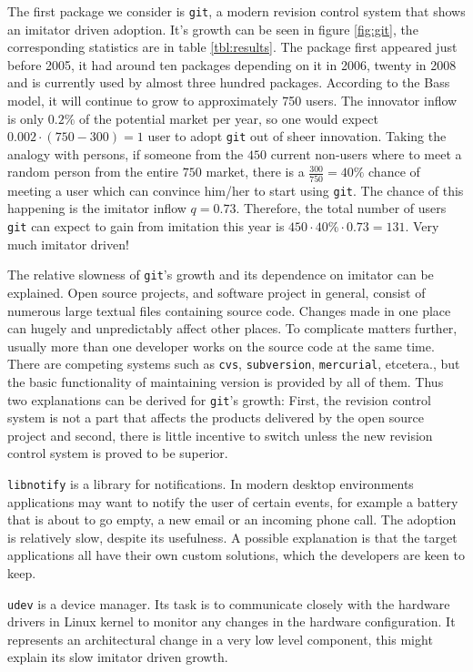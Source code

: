 \documentclass[smallextended,final]{svjour3}
\begin{document}
The first package we consider is \verb|git|, a modern revision control system that shows an imitator driven adoption. It's growth can be seen in figure \ref{fig:git}, the corresponding statistics are in table \ref{tbl:results}. The package first appeared just before 2005, it had around ten packages depending on it in 2006, twenty in 2008 and is currently used by almost three hundred packages. According to the Bass model, it will continue to grow to approximately 750 users. The innovator inflow is only $0.2\%$ of the potential market per year, so one would expect $0.002\cdot (750 - 300) = 1$ user to adopt \verb|git| out of sheer innovation. Taking the analogy with persons, if someone from the $450$ current non-users where to meet a random person from the entire $750$ market, there is a $\frac{300}{750}= 40\%$ chance of meeting a user which can convince him/her to start using \verb|git|. The chance of this happening is the imitator inflow $q = 0.73$. Therefore, the total number of users \verb|git| can expect to gain from imitation this year is $450\cdot 40\%\cdot 0.73 = 131$. Very much imitator driven!

The relative slowness of \verb|git|'s growth and its dependence on imitator can be explained. Open source projects, and software project in general, consist of numerous large textual files containing source code. Changes made in one place can hugely and unpredictably affect other places. To complicate matters further, usually more than one developer works on the source code at the same time. There are competing systems such as \verb|cvs|, \verb|subversion|, \verb|mercurial|, etcetera., but the basic functionality of maintaining version is provided by all of them. Thus two explanations can be derived for \verb|git|'s growth: First, the revision control system is not a part that affects the products delivered by the open source project and second, there is little incentive to switch unless the new revision control system is proved to be superior.

\verb|libnotify| is a library for notifications. In modern desktop environments applications may want to notify the user of certain events, for example a battery that is about to go empty, a new email or an incoming phone call. The adoption is relatively slow, despite its usefulness. A possible explanation is that the target applications all have their own custom solutions, which the developers are keen to keep.

\verb|udev| is a device manager. Its task is to communicate closely with the hardware drivers in Linux kernel to monitor any changes in the hardware configuration. It represents an architectural change in a very low level component, this might explain its slow imitator driven growth.
\end{document}
